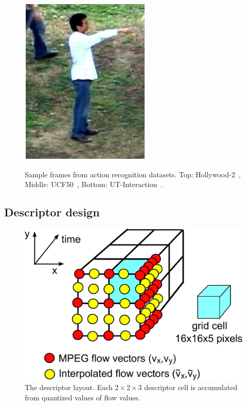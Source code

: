 \documentclass[10pt,twocolumn,letterpaper]{article}
\begin{document}
\begin{figure}[!t]
\begin{center}
\includegraphics[scale=0.4]{figures/dataset_thumb/uti/crop_class6.pdf} \\
\smallskip
\caption{Sample frames from action recognition datasets. Top: Hollywood-2~\cite{Marszalek09}, Middle: UCF50~\cite{Reddy12}, Bottom: UT-Interaction~\cite{Ryoo10}.\vspace{-.5cm}}
\label{fig:datasets}
\end{center}
\end{figure}

\subsection{Descriptor design}

\begin{figure}
\begin{center}
\includegraphics[width=.7\linewidth]{figures/CD-descriptor2.pdf}
\caption{The descriptor layout. Each $2\times2\times3$ descriptor cell is accumulated from quantized values of flow values.\vspace{-.7cm}}
\label{fig:CDdescriptor}
\end{center}
\end{figure}
\end{document}
